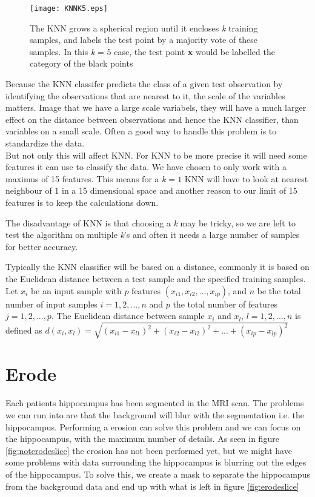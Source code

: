 \begin{figure}[H]
  \centering
  \texttt{[image: KNNK5.eps]}
  \caption{The KNN grows a spherical region until it encloses \textit{k} training samples, and labels the test point by a majority vote of these samples. In this \textit{k} = 5 case, the test point \textbf{x} would be labelled the category of the black points}\label{fig:KNNK5}
\end{figure}

Because the KNN classifer predicts the class of a given test observation by identifying the observations that are nearest to it, the scale of the variables matters. Image that we have a large scale variabels, they will have a much larger effect on the distance between observations and hence the KNN classifier, than variables on a small scale. Often a good way to handle this problem is to standardize the data.\\
But not only this will affect KNN. For KNN to be more precise it will need some features it can use to classify the data. We have chosen to only work with a maximus of 15 features. This means for a $k=1$ KNN will have to look at nearest neighbour of 1 in a 15 dimensional space and another reason to our limit of 15 features is to keep the calculations down.


The disadvantage of KNN is that choosing a \textit{k} may be tricky, so we are left to test the algorithm on multiple \textit{k}'s and often it needs a large number of samples for better accuracy.

Typically the KNN classifier will be based on a distance, commonly it is based on the Euclidean distance between a test sample and the specified training samples. Let $x_i$ be an input sample with $p$ features $(x_{i1}, x_{i2},...,x_{ip})$, and $n$ be the total number of input samples $i=1,2,...,n$ and $p$ the total number of features $j=1,2,...,p$. The Euclidean distance between sample $x_i$ and $x_l$, $l=1,2,...,n$ is defined as $d(x_i,x_l) = \sqrt{(x_{i1}-x_{l1})^2+(x_{i2}-x_{l2})^2+...+(x_{ip}-x_{lp})^2}$

\section{Erode}

Each patients hippocampus has been segmented in the MRI scan. The problems we can run into are that the background will blur with the segmentation i.e. the hippocampus. Performing a erosion can solve this problem and we can focus on the hippocampus, with the maximum number of details. As seen in figure \ref{fig:noterodeslice} the erosion has not been performed yet, but we might have some problems with data surrounding the hippocampus is blurring out the edges of the hippocampus. To solve this, we create a mask to separate the hippocampus from the background data and end up with what is left in figure \ref{fig:erodeslice}

